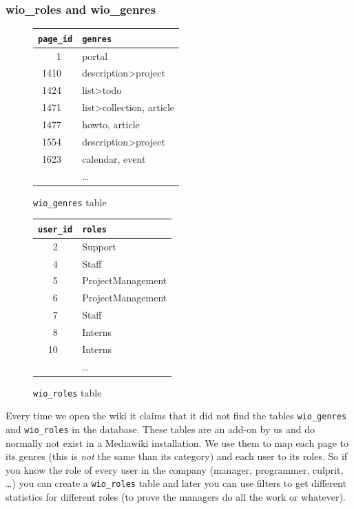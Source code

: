 \documentclass[a4paper]{scrartcl}
\newcommand{\code}[1]{\texttt{\color{code}#1}}
\begin{document}
\subsubsection{wio\_roles and wio\_genres}
\label{sec:wioroles}

\begin{figure}
  \parbox[b]{.5\textwidth}{\centering
  \begin{tabular}{rll}\toprule
    \multicolumn{2}{l}{\code{page\_id}} & \code{genres}\\\midrule
    1 && portal\\
    1410 && description>project\\
    1424 && list>todo\\
    1471 && list>collection, article\\
    1477 && howto, article\\
    1554 && description>project\\
    1623 && calendar, event\\
    && \dots\\
    \bottomrule
  \end{tabular}
  \caption{\code{wio\_genres} table}
  \label{fig:wio_genres}}
  \parbox[b]{.5\textwidth}{\centering
  \begin{tabular}{rll}\toprule
    \multicolumn{2}{l}{\code{user\_id}} & \code{roles}\\\midrule
     2 && Support\\
     4 && Staff\\
     5 && ProjectManagement\\
     6 && ProjectManagement\\
     7 && Staff\\
     8 && Interns\\
    10 && Interns\\
    && \dots\\
    \bottomrule
  \end{tabular}
  \caption{\code{wio\_roles} table}
  \label{fig:wio_roles}}

\end{figure}

Every time we open the wiki it claims that it did not find the tables
\code{wio\_genres} and \code{wio\_roles} in the database. These tables
are an add-on by us and do normally not exist in a Mediawiki
installation. We use them to map each page to its genres (this is
\emph{not} the same than its category) and each user to its roles. So
if you know the role of every user in the company (manager,
programmer, culprit, \dots) you can create a \code{wio\_roles} table
and later you can use filters to get different statistics for
different roles (to prove the managers do all the work or whatever).
\end{document}
